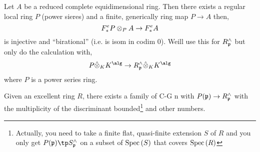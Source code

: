 \documentclass[12pt]{article}
\begin{document}
Let $A$ be a reduced complete equidimensional ring. Then there exists a regular local ring $P$ (power sieres) and a finite, generically \etale ring map $P \to A$ then,
\[ F^e_* P \otimes_P A \to F^e_* A \]
is injective and ``birational'' (i.e. is isom in codim $0$). Weill use this for $R_{\mathfrak{p}}^{\wedge}$ but only do the calculation with,
\[ P \hat{\ot}_K K^{\alg} \to R^{\wedge}_\p \hat{\ot}_K K^\alg \]
where $P$ is a power series ring.

\begin{prop}
Given an excellent ring $R$, there exists a family of C-G n with $P(\mathfrak{p}) \to R_{\mathfrak{p}}^{\wedge}$ with the multiplicity of the discriminant bounded\footnote{Actually, you need to take a finite flat, quasi-finite extension $S$ of $R$ and you only get $P(\p) \tp S_\p^{\wedge}$ on a subset of $\mathrm{Spec}\left( S \right)$ that covers $\mathrm{Spec}\left( R \right)$} and other numbers. 
\end{prop}
\end{document}
